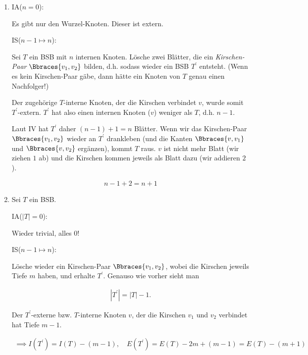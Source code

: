 \begin{solution}

\phantom{}

\begin{enumerate}[label = \alph*]

    \item IA($n = 0$):
    
    Es gibt nur den Wurzel-Knoten.
    Dieser ist extern.

    IS($n-1 \mapsto n$):

    Sei $T$ ein BSB mit $n$ internen Knoten.
    Lösche zwei Blätter, die ein \textit{Kirschen-Paar} $\Bbraces{v_1, v_2}$ bilden, d.h. sodass wieder ein BSB $T^\prime$ entsteht.
    (Wenn es kein Kirschen-Paar gäbe, dann hätte ein Knoten von $T$ genau einen Nachfolger!)

    Der zugehörige $T$-interne Knoten, der die Kirschen verbindet $v$, wurde somit $T^\prime$-extern.
    $T^\prime$ hat also einen internen Knoten ($v$) weniger als $T$, d.h. $n - 1$.

    Laut IV hat $T^\prime$ daher $(n - 1) + 1 = n$ Blätter.
    Wenn wir das Kirschen-Paar $\Bbraces{v_1, v_2}$ wieder an $T^\prime$ drankleben (und die Kanten $\Bbraces{v, v_1}$ und $\Bbraces{v, v_2}$ ergänzen), kommt $T$ raus.
    $v$ ist nicht mehr Blatt (wir ziehen $1$ ab) und die Kirschen kommen jeweils als Blatt dazu (wir addieren $2$).

    \begin{align*}
        n - 1 + 2 = n + 1
    \end{align*}

    \item Sei $T$ ein BSB.    

    IA($|T| = 0$):
    
    Wieder trivial, alles $0$!

    IS($n-1 \mapsto n$):

    Lösche wieder ein Kirschen-Paar $\Bbraces{v_1, v_2}$, wobei die Kirschen jeweils Tiefe $m$ haben, und erhalte $T^\prime$.
    Genauso wie vorher sieht man

    \begin{align*}
        |T^\prime| = |T| - 1.
    \end{align*}

    Der $T^\prime$-externe bzw. $T$-interne Knoten $v$, der die Kirschen $v_1$ und $v_2$ verbindet hat Tiefe $m - 1$.

    \begin{align*}
        \implies
        I(T^\prime) = I(T) - (m - 1),
        \quad
        E(T^\prime) = E(T) - 2 m + (m - 1) = E(T) - (m + 1)
    \end{align*}


\end{enumerate}
\end{solution}

